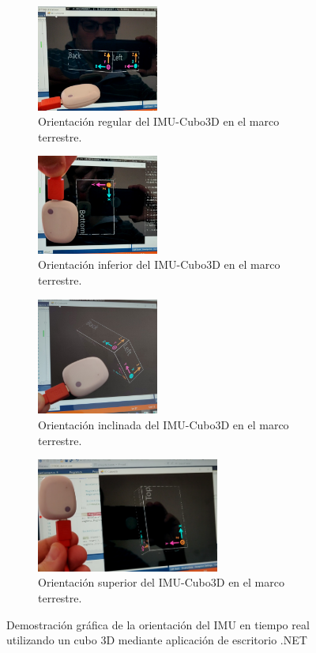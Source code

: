 \begin{figure}[!h]
     \centering
     \begin{subfigure}[b]{0.4\textwidth}
         \centering
         \includegraphics[width=4cm]{TESIS/imagenes/chap06/regular-orientation.png}
         \caption{Orientación regular del IMU-Cubo3D en el marco terrestre. }
     \end{subfigure}
     \begin{subfigure}[b]{0.4\textwidth}
         \centering
         \includegraphics[width=4cm]{TESIS/imagenes/chap06/top-orientation.png}
    \caption{Orientación inferior del IMU-Cubo3D en el marco terrestre.}
     \end{subfigure}
      \begin{subfigure}[b]{0.4\textwidth}
         \centering
         \includegraphics[width=4cm]{TESIS/imagenes/chap06/inclined-orientation.jpg}
    \caption{Orientación inclinada del IMU-Cubo3D en el marco terrestre.}
     \end{subfigure}
      \begin{subfigure}[b]{0.4\textwidth}
         \centering
         \includegraphics[width=6cm]{TESIS/imagenes/chap06/bottom-orientation.png}
         \caption{Orientación superior del IMU-Cubo3D en el marco terrestre.}
     \end{subfigure}
     \caption{Demostración gráfica de la orientación del IMU en tiempo real utilizando un cubo 3D mediante aplicación de escritorio .NET}
     \label{fig:3d rotation-orientation}
 \end{figure}


